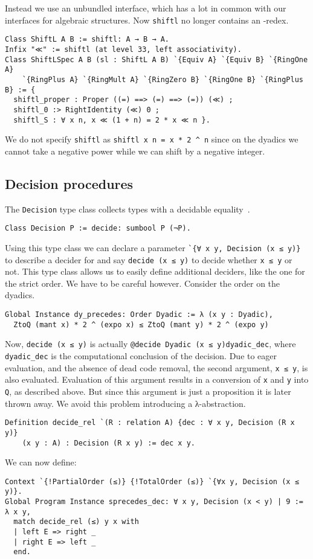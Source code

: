\documentclass[a4paper,10pt,runningheads]{llncs}
\begin{document}
Instead we use an unbundled interface, which has a lot in common with our interfaces for algebraic structures. Now \lstinline|shiftl| no longer contains an -redex. 
\begin{lstlisting}
Class ShiftL A B := shiftl: A → B → A.
Infix "≪" := shiftl (at level 33, left associativity).
Class ShiftLSpec A B (sl : ShiftL A B) `{Equiv A} `{Equiv B} `{RingOne A} 
	`{RingPlus A} `{RingMult A} `{RingZero B} `{RingOne B} `{RingPlus B} := {
  shiftl_proper : Proper ((=) ==> (=) ==> (=)) (≪) ;
  shiftl_0 :> RightIdentity (≪) 0 ;
  shiftl_S : ∀ x n, x ≪ (1 + n) = 2 * x ≪ n }.
\end{lstlisting}
We do not specify \lstinline|shiftl| as \lstinline|shiftl x n = x * 2 ^ n| since on the dyadics we cannot take a negative power while we can shift by a negative integer.

\subsection{Decision procedures}
\label{section:decision}
The \lstinline|Decision| type class collects types with a decidable equality~\cite{math-classes}.
\begin{lstlisting}
Class Decision P := decide: sumbool P (¬P).
\end{lstlisting}
Using this type class we can declare a parameter \lstinline|`{∀ x y, Decision (x ≤ y)}| to describe a decider for  and say \lstinline|decide (x ≤ y)| to decide whether \lstinline|x ≤ y| or not. This type class allows us to easily define additional deciders, like the one for the strict order. We have to be careful however. Consider the order on the dyadics.
\begin{lstlisting}
Global Instance dy_precedes: Order Dyadic := λ (x y : Dyadic), 
  ZtoQ (mant x) * 2 ^ (expo x) ≤ ZtoQ (mant y) * 2 ^ (expo y)
\end{lstlisting}
Now, \lstinline|decide (x ≤ y)| is actually \lstinline|@decide Dyadic (x ≤ y)dyadic_dec|, where \lstinline|dyadic_dec| is the computational conclusion of the decision. Due to eager evaluation, and the absence of dead code removal, the second argument, \lstinline|x ≤ y|, is also evaluated. Evaluation of this argument results in a conversion of \lstinline|x| and \lstinline|y| into \lstinline|Q|, as described above. But since this argument is just a proposition it is later thrown away. We avoid this problem introducing a λ-abstraction.
\begin{lstlisting}
Definition decide_rel `(R : relation A) {dec : ∀ x y, Decision (R x y)} 
	(x y : A) : Decision (R x y) := dec x y.
\end{lstlisting}
We can now define:
\begin{lstlisting}
Context `{!PartialOrder (≤)} {!TotalOrder (≤)} `{∀x y, Decision (x ≤ y)}.
Global Program Instance sprecedes_dec: ∀ x y, Decision (x < y) | 9 := λ x y,
  match decide_rel (≤) y x with
  | left E => right _
  | right E => left _
  end.
\end{lstlisting}
\end{document}
